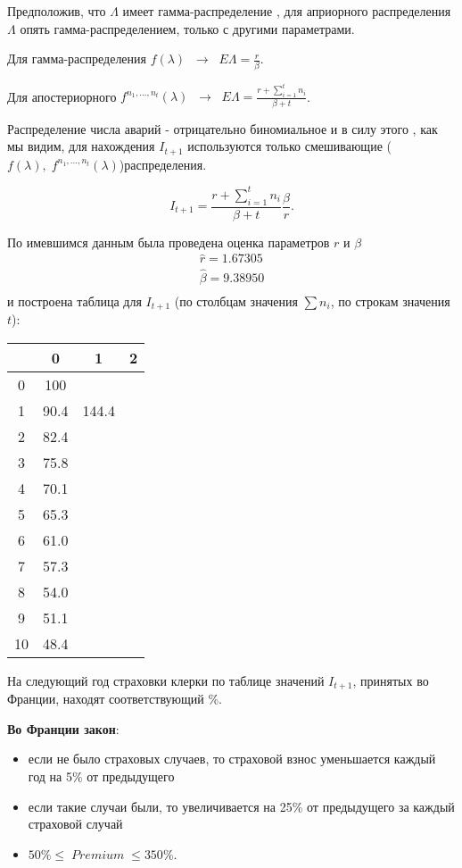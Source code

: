 Предположив, что $\Lambda$ имеет гамма-распределение , для априорного распределения $\Lambda$ опять гамма-распределением, только с другими параметрами.

Для гамма-распределения $f(\lambda) \;\; \rightarrow \;\; E\Lambda = \frac{r}{\beta}$.

Для апостериорного $f^{n_1,...,n_t}(\lambda) \;\; \rightarrow \;\; E\Lambda = \frac{r+\sum\limits_{i=1}^{t}n_i}{\beta + t}$.

Распределение числа аварий - отрицательно биномиальное и в силу этого , как мы видим, для нахождения $I_{t+1}$ используются только смешивающие ($f(\lambda) ,\;f^{n_1,...,n_t}(\lambda)$)распределения.

\[ I_{t+1}= \frac{r + \sum\limits_{i=1}^{t}n_i}{\beta+t}\frac{\beta}{r}.\]

По имевшимся данным была проведена оценка параметров $r$ и $\beta$
\begin{gather*}
	\hat{r} = 1.67305\\
	\hat{\beta} = 9.38950\\
\end{gather*}
и построена таблица для $I_{t+1}$ (по столбцам значения $\sum n_i$, по строкам значения $t$):

\begin{center}

	\begin{tabular}{ |c|c|c|c|} 
	 \hline
	  & 0 & 1 &  2 \\
	 \hline 
	 0 & 100 &  &  \\ 
	 \hline
	 1 & 90.4 & 144.4 & \\ 
	 \hline
	 2 & 82.4 &  & \\ 
	 \hline
	 3 & 75.8 &  & \\ 
	 \hline
	 4 & 70.1 &  & \\ 
	 \hline
	 5 & 65.3 &  & \\ 
	 \hline
	 6 & 61.0 &  & \\ 
	 \hline
	 7 & 57.3 &  & \\ 
	 \hline
	 8 & 54.0 &  & \\ 
	 \hline
	 9 & 51.1 &  & \\ 
	 \hline
	 10 & 48.4 &  & \\ 
	 \hline
	\end{tabular}
\end{center}

На следующий год страховки клерки по таблице значений $I_{t+1}$, принятых во Франции, находят соответствующий  \%.

\textbf{Во Франции закон}:
\begin{itemize}
	\item если не было страховых случаев, то страховой взнос уменьшается каждый год на 5\% от предыдущего 
	\item если такие случаи были, то увеличивается на 25\% от предыдущего за каждый страховой случай
	\item $50\% \leq \; Premium \; \leq 350\%.$ 
\end{itemize}

